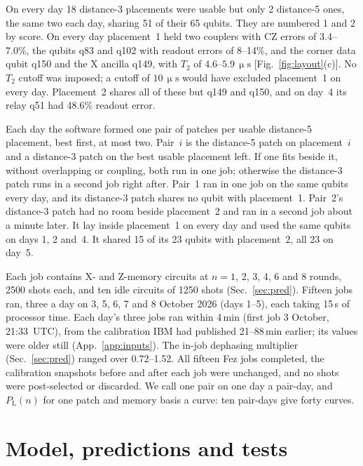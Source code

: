 \documentclass[aps,pra,reprint,nofootinbib,longbibliography,floatfix,showkeys]{revtex4-2}
\newcommand{\us}{\,\upmu\mathrm{s}}
\newcommand{\PL}{P_{\mathrm{L}}}
\begin{document}
On every day 18 distance-3 placements were usable but only 2 distance-5 ones, the same two each day, sharing 51 of their 65 qubits.
They are numbered 1 and 2 by score.
On every day placement~1 held two couplers with CZ errors of 3.4--7.0\%, the qubits q83 and q102 with readout errors of 8--14\%, and the corner data qubit q150 and the X ancilla q149, with $T_2$ of 4.6--$5.9\us$ [Fig.~\ref{fig:layout}(c)].
No $T_2$ cutoff was imposed; a cutoff of $10\us$ would have excluded placement~1 on every day.
Placement~2 shares all of these but q149 and q150, and on day~4 its relay q51 had 48.6\% readout error.

Each day the software formed one pair of patches per usable distance-5 placement, best first, at most two.
Pair~$i$ is the distance-5 patch on placement~$i$ and a distance-3 patch on the best usable placement left.
If one fits beside it, without overlapping or coupling, both run in one job; otherwise the distance-3 patch runs in a second job right after.
Pair~1 ran in one job on the same qubits every day, and its distance-3 patch shares no qubit with placement~1.
Pair~2's distance-3 patch had no room beside placement~2 and ran in a second job about a minute later.
It lay inside placement~1 on every day and used the same qubits on days 1, 2 and~4.
It shared 15 of its 23 qubits with placement~2, all 23 on day~5.

Each job contains X- and Z-memory circuits at $n = 1$, 2, 3, 4, 6 and 8 rounds, 2500 shots each, and ten idle circuits of 1250 shots (Sec.~\ref{sec:pred}).
Fifteen jobs ran, three a day on 3, 5, 6, 7 and 8 October 2026 (days 1--5), each taking 15\,s of processor time.
Each day's three jobs ran within 4\,min (first job 3 October, 21:33~UTC), from the calibration IBM had published 21--88\,min earlier; its values were older still (App.~\ref{app:inputs}).
The in-job dephasing multiplier (Sec.~\ref{sec:pred}) ranged over 0.72--1.52.
All fifteen Fez jobs completed, the calibration snapshots before and after each job were unchanged, and no shots were post-selected or discarded.
We call one pair on one day a pair-day, and $\PL(n)$ for one patch and memory basis a curve: ten pair-days give forty curves.

\section{Model, predictions and tests}
\label{sec:model}
\end{document}
